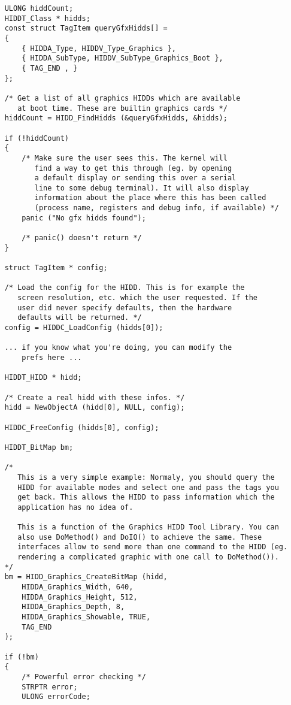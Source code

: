 \begin{verbatim}
	ULONG hiddCount;
	HIDDT_Class * hidds;
	const struct TagItem queryGfxHidds[] =
	{
	    { HIDDA_Type, HIDDV_Type_Graphics },
	    { HIDDA_SubType, HIDDV_SubType_Graphics_Boot },
	    { TAG_END , }
	};

	/* Get a list of all graphics HIDDs which are available
	   at boot time. These are builtin graphics cards */
	hiddCount = HIDD_FindHidds (&queryGfxHidds, &hidds);

	if (!hiddCount)
	{
	    /* Make sure the user sees this. The kernel will
	       find a way to get this through (eg. by opening
	       a default display or sending this over a serial
	       line to some debug terminal). It will also display
	       information about the place where this has been called
	       (process name, registers and debug info, if available) */
	    panic ("No gfx hidds found");

	    /* panic() doesn't return */
	}

	struct TagItem * config;

	/* Load the config for the HIDD. This is for example the
	   screen resolution, etc. which the user requested. If the
	   user did never specify defaults, then the hardware
	   defaults will be returned. */
	config = HIDDC_LoadConfig (hidds[0]);

	... if you know what you're doing, you can modify the
	    prefs here ...

	HIDDT_HIDD * hidd;

	/* Create a real hidd with these infos. */
	hidd = NewObjectA (hidd[0], NULL, config);

	HIDDC_FreeConfig (hidds[0], config);

	HIDDT_BitMap bm;

	/*
	   This is a very simple example: Normaly, you should query the
	   HIDD for available modes and select one and pass the tags you
	   get back. This allows the HIDD to pass information which the
	   application has no idea of.

	   This is a function of the Graphics HIDD Tool Library. You can
	   also use DoMethod() and DoIO() to achieve the same. These
	   interfaces allow to send more than one command to the HIDD (eg.
	   rendering a complicated graphic with one call to DoMethod()).
	*/
	bm = HIDD_Graphics_CreateBitMap (hidd,
		HIDDA_Graphics_Width, 640,
		HIDDA_Graphics_Height, 512,
		HIDDA_Graphics_Depth, 8,
		HIDDA_Graphics_Showable, TRUE,
		TAG_END
	);

	if (!bm)
	{
	    /* Powerful error checking */
	    STRPTR error;
	    ULONG errorCode;


\end{verbatim}
